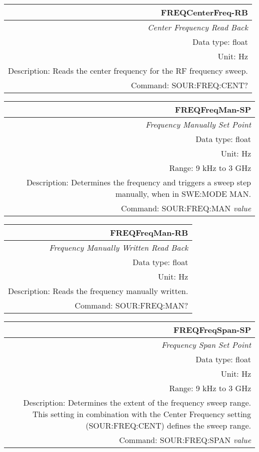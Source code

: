 \documentclass[openany]{article}
\begin{document}
		\begin{tabular}{N}
			\hline
			\bfseries FREQCenterFreq-RB \\ \hline
			\emph{Center Frequency Read Back} \\
			Data type: float \\
			Unit: Hz \\
			Description: Reads the center frequency for the RF frequency sweep. \\
			Command: SOUR:FREQ:CENT? \\

		\end{tabular}
%
		\begin{tabular}{N}
			\hline
			\bfseries FREQFreqMan-SP \\ \hline
			\emph{Frequency Manually Set Point} \\
			Data type: float \\
			Unit: Hz \\
			Range: 9 kHz to 3 GHz \\
			Description: Determines the frequency and triggers a sweep step manually, when in SWE:MODE MAN. \\
			Command: SOUR:FREQ:MAN \emph{value} \\
			
		\end{tabular}


		\begin{tabular}{N}
			\hline
			\bfseries FREQFreqMan-RB \\ \hline
			\emph{Frequency Manually Written Read Back} \\
			Data type: float \\
			Unit: Hz \\
			Description: Reads the frequency manually written. \\
			Command: SOUR:FREQ:MAN? \\

		\end{tabular}
%
		\begin{tabular}{N}
			\hline
			\bfseries FREQFreqSpan-SP \\ \hline
			\emph{Frequency Span Set Point} \\
			Data type: float \\
			Unit: Hz \\
			Range: 9 kHz to 3 GHz \\
			Description: Determines the extent of the frequency sweep range. This setting in combination with the Center Frequency setting (SOUR:FREQ:CENT) defines the sweep range. \\
			Command: SOUR:FREQ:SPAN \emph{value} \\
			
		\end{tabular}
\end{document}
